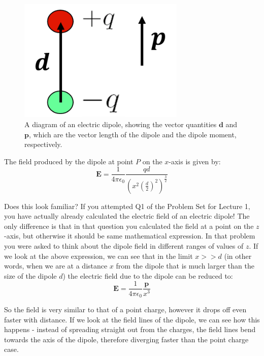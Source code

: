 \documentclass[
  letterpaper,
  DIV=11,
  numbers=noendperiod]{scrreprt}
\begin{document}
\begin{figure}[H]

{\centering \includegraphics[width=3.125in,height=\textheight]{Figures/dipole_moment.png}

}

\caption{A diagram of an electric dipole, showing the vector quantities
\(\mathrm{\mathbf{d}}\) and \(\mathrm{\mathbf{p}}\), which are the
vector length of the dipole and the dipole moment, respectively.}

\end{figure}%

The field produced by the dipole at point \(P\) on the \(x\)-axis is
given by: \[
\mathrm{\mathbf{E}}= \frac{1}{4\pi \epsilon_0} \frac{qd}{ \left( x^2 \left( \frac{d}{2} \right)^2 \right)^{\frac{3}{2}} }
\]

Does this look familiar? If you attempted Q1 of the Problem Set for
Lecture 1, you have actually already calculated the electric field of an
electric dipole! The only difference is that in that question you
calculated the field at a point on the \(z\)-axis, but otherwise it
should be same mathematical expression. In that problem you were asked
to think about the dipole field in different ranges of values of \(z\).
If we look at the above expression, we can see that in the limit
\(x >> d\) (in other words, when we are at a distance \(x\) from the
dipole that is much larger than the size of the dipole \(d\)) the
electric field due to the dipole can be reduced to: \[
\mathrm{\mathbf{E}}= \frac{1}{4 \pi \epsilon_0} \frac{\mathrm{\mathbf{p}}}{x^3}
\]

So the field is very similar to that of a point charge, however it drops
off even faster with distance. If we look at the field lines of the
dipole, we can see how this happens - instead of spreading straight out
from the charges, the field lines bend towards the axis of the dipole,
therefore diverging faster than the point charge case.
\end{document}
